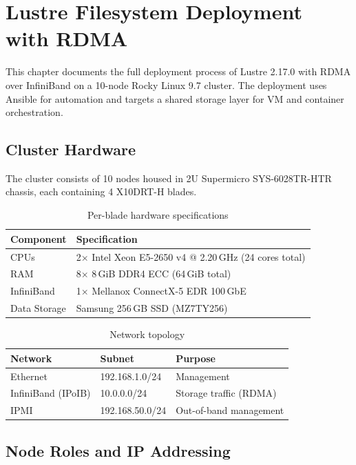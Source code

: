 \chapter{Lustre Filesystem Deployment with RDMA}
\label{ch:lustre-deployment}

This chapter documents the full deployment process of Lustre 2.17.0 with RDMA over InfiniBand on a 10-node Rocky Linux 9.7 cluster. The deployment uses Ansible for automation and targets a shared storage layer for VM and container orchestration.

\section{Cluster Hardware}

The cluster consists of 10 nodes housed in 2U Supermicro SYS-6028TR-HTR chassis, each containing 4 X10DRT-H blades.

\begin{table}[h]
\centering
\caption{Per-blade hardware specifications}
\label{tab:blade-specs}
\begin{tabular}{ll}
\hline
\textbf{Component} & \textbf{Specification} \\
\hline
CPUs & 2$\times$ Intel Xeon E5-2650 v4 @ 2.20\,GHz (24 cores total) \\
RAM & 8$\times$ 8\,GiB DDR4 ECC (64\,GiB total) \\
InfiniBand & 1$\times$ Mellanox ConnectX-5 EDR 100\,GbE \\
Data Storage & Samsung 256\,GB SSD (MZ7TY256) \\
\hline
\end{tabular}
\end{table}

\begin{table}[h]
\centering
\caption{Network topology}
\label{tab:network}
\begin{tabular}{lll}
\hline
\textbf{Network} & \textbf{Subnet} & \textbf{Purpose} \\
\hline
Ethernet & 192.168.1.0/24 & Management \\
InfiniBand (IPoIB) & 10.0.0.0/24 & Storage traffic (RDMA) \\
IPMI & 192.168.50.0/24 & Out-of-band management \\
\hline
\end{tabular}
\end{table}

\section{Node Roles and IP Addressing}

